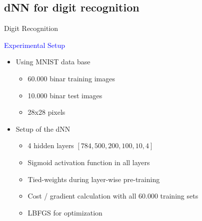 	\subsection{dNN for digit recognition}
	
	\begin{frame}[t]{Digit Recognition}
	
	\begin{minipage}[t]{0.48\linewidth}
	\textcolor{blue}{\Large Experimental Setup}	
	\begin{itemize}
			
			\item Using MNIST data base 
				\begin{itemize}
					\item 60.000 binar training images
					\item 10.000 binar test images
					\item 28x28 pixels
				\end{itemize}
							
			\item Setup of the dNN			
				\begin{itemize}
					\item 4 hidden layers $[784, 500, 200, 100, 10, 4]$
					\item Sigmoid activation function in all layers
					\item Tied-weights during layer-wise pre-training
					\item Cost / gradient calculation with all 60.000 training sets
					\item LBFGS for optimization 
				\end{itemize}
		\end{itemize}
	\end{minipage}\hfill
	\begin{minipage}[t]{0.48\linewidth}
	\end{minipage}
		
	\end{frame}
	
